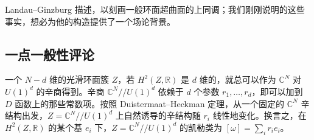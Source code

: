 \label{op:58}
Landau--Ginzburg 描述，以刻画一般环面超曲面的上同调；我们刚刚说明的这些事实，想必为他的构造提供了一个场论背景。

\subsection*{一点一般性评论}

一个 $N-d$ 维的光滑环面簇 $Z$，若 $H^2(Z,\mathbb{R})$ 是 $d$ 维的，就总可以作为 $\mathbb{C}^N$ 对 $U(1)^d$ 的辛商得到。辛商 $\mathbb{C}^N/\!/U(1)^d$ 依赖于 $d$ 个参数 $r_1,\dots,r_d$，即可以加到 $D$ 函数上的那些常数项。按照 Duistermaat--Heckman 定理，从一个固定的 $\mathbb{C}^N$ 辛结构出发，$Z=\mathbb{C}^N/\!/U(1)^d$ 上自然诱导的辛结构随 $r_i$ 线性地变化。换言之，在 $H^2(Z,\mathbb{R})$ 的某个基 $e_i$ 下，$Z=\mathbb{C}^N/\!/U(1)^d$ 的凯勒类为 $[\omega]=\sum_i r_ie_i$。

